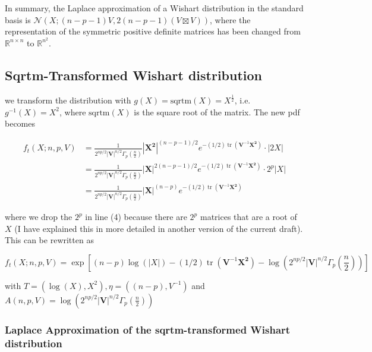 \documentclass{article}
\begin{document}
In summary, the Laplace approximation of a Wishart distribution in the standard basis is $\mathcal{N}\left(X; (n-p-1)V, 2(n-p-1)(V \boxtimes V)\right)$, where the representation of the symmetric positive definite matrices has been changed from $\mathbb{R}^{n\times n}$ to $\mathbb{R}^{n^2}$.


\subsection{Sqrtm-Transformed Wishart distribution}

we transform the distribution with $g(X) = \text{sqrtm}(X) = X^{\frac{1}{2}}$, i.e. $g^{-1}(X) = X^2$, where $\text{sqrtm}(X)$ is the square root of the matrix. The new pdf becomes

\begin{align}
f_t(X; n,p,V) &= \frac{1}{2^{np/2} \left|{\mathbf V}\right|^{n/2} \Gamma_p\left(\frac {n}{2}\right ) }{\left|\mathbf{X^2}\right|}^{(n-p-1)/2} e^{-(1/2)\operatorname{tr}({\mathbf V}^{-1}\mathbf{X^2})} \cdot |2X| \\ 
&= \frac{1}{2^{np/2} \left|{\mathbf V}\right|^{n/2} \Gamma_p\left(\frac {n}{2}\right ) }{\left|\mathbf{X}\right|}^{2(n-p-1)/2} e^{-(1/2)\operatorname{tr}({\mathbf V}^{-1}\mathbf{X^2})} \cdot 2^p|X| \\
&= \frac{1}{2^{np/2} \left|{\mathbf V}\right|^{n/2} \Gamma_p\left(\frac {n}{2}\right ) }{\left|\mathbf{X}\right|}^{(n-p)} e^{-(1/2)\operatorname{tr}({\mathbf V}^{-1}\mathbf{X^2})} 
\label{eq:wishart_trans_sqrtm_pdf}
\end{align}

where we drop the $2^p$ in line (4) because there are $2^p$ matrices that are a root of $X$ (I have explained this in more detailed in another version of the current draft). This can be rewritten as 

\begin{equation}
f_t(X; n,p,V) = \exp \left[(n-p) \log(|X|) - (1/2)\operatorname{tr}({\mathbf V}^{-1}\mathbf{X^2}) - \log\left(2^{np/2} \left|{\mathbf V}\right|^{n/2} \Gamma_p\left(\frac {n}{2}\right )\right)\right]
\end{equation}

with $T=(\log(X), X^2), \eta=((n-p), V^{-1})$ and $A(n,p,V)=\log\left(2^{np/2} \left|{\mathbf V}\right|^{n/2} \Gamma_p\left(\frac {n}{2}\right )\right)$


\subsubsection{Laplace Approximation of the sqrtm-transformed Wishart distribution}
\end{document}
